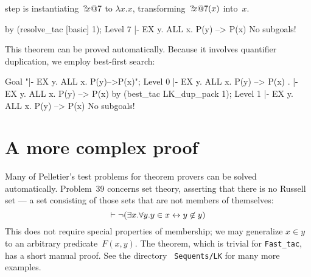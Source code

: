 step is instantiating~${?\!x@7}$ to $\lambda x. x$,
transforming~${?\!x@7}(x)$ into~$x$.
\begin{ttbox}
by (resolve_tac [basic] 1);
{\out Level 7}
{\out  |- EX y. ALL x. P(y) --> P(x)}
{\out No subgoals!}
\end{ttbox}
This theorem can be proved automatically.  Because it involves quantifier
duplication, we employ best-first search:
\begin{ttbox}
Goal "|- EX y. ALL x. P(y)-->P(x)";
{\out Level 0}
{\out  |- EX y. ALL x. P(y) --> P(x)}
{.  |- EX y. ALL x. P(y) --> P(x)}
by (best_tac LK_dup_pack 1);
{\out Level 1}
{\out  |- EX y. ALL x. P(y) --> P(x)}
{\out No subgoals!}
\end{ttbox}



\section{A more complex proof}
Many of Pelletier's test problems for theorem provers \cite{pelletier86}
can be solved automatically.  Problem~39 concerns set theory, asserting
that there is no Russell set --- a set consisting of those sets that are
not members of themselves:
\[  \vdash \neg (\exists x. \forall y. y\in x \leftrightarrow y\not\in y) \]
This does not require special properties of membership; we may generalize
$x\in y$ to an arbitrary predicate~$F(x,y)$.  The theorem, which is trivial
for \texttt{Fast_tac}, has a short manual proof.  See the directory {\tt
  Sequents/LK} for many more examples.

